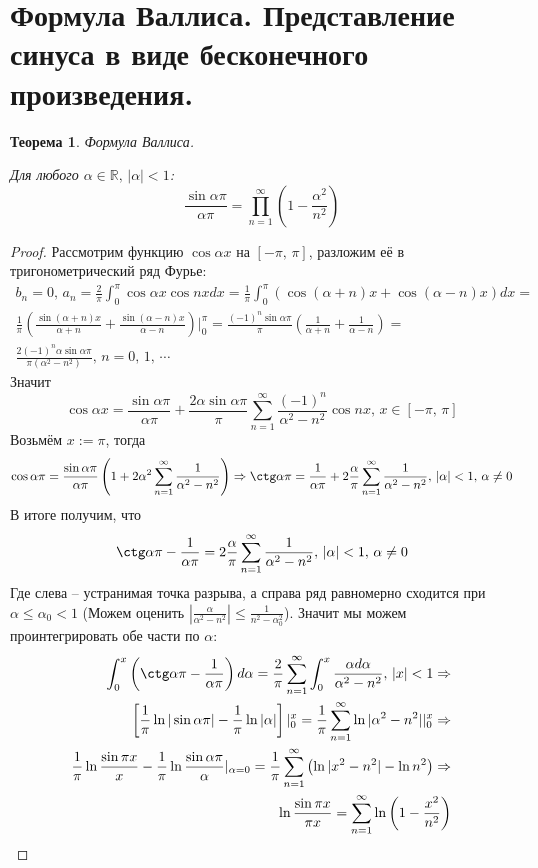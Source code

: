 \documentclass[a4paper,12pt]{article}
\renewcommand{\leq}{\ensuremath{\leqslant}}
\theoremstyle{plain}
\newtheorem{theorem}{Теорема}[section]
\theoremstyle{definition}
\theoremstyle{remark}
\begin{document}
\section{Формула Валлиса. Представление синуса в виде бесконечного произведения.}
\begin{theorem}
	Формула Валлиса.

	Для любого $\alpha \in \mathbb{R},\, |\alpha| < 1$:
	\[\frac{\sin \alpha\pi}{\alpha\pi} = \prod_{n = 1}^\infty \left(1 - \frac{\alpha^2}{n^2}\right)\]
\end{theorem}
\begin{proof}
	Рассмотрим функцию $\cos\alpha x$ на $[-\pi,\,\pi]$, разложим её в тригонометрический ряд Фурье:
	\begin{align*}
		b_n = 0,\, a_n = \frac{2}{\pi}\int_0^\pi\cos\alpha x\cos nxdx = \frac{1}{\pi}\int_0^\pi(\cos(\alpha + n)x + \cos(\alpha - n)x)dx =                                                                        \\
		\frac{1}{\pi}\left(\frac{\sin(\alpha + n)x}{\alpha + n} + \frac{\sin(\alpha - n)x}{\alpha - n}\right)|_0^\pi = \frac{(-1)^n\sin\alpha\pi}{\pi}\left(\frac{1}{\alpha + n} + \frac{1}{\alpha - n }\right) = \\
		\frac{2(-1)^n\alpha\sin\alpha\pi}{\pi(\alpha^2 - n^2)},\, n = 0,\,1,\,\cdots
	\end{align*}
	Значит
	\[\cos\alpha x = \frac{\sin\alpha\pi}{\alpha\pi} + \frac{2\alpha\sin\alpha\pi}{\pi}\sum_{n = 1}^\infty \frac{(-1)^n}{\alpha^2 - n^2}\cos nx,\, x \in [-\pi,\,\pi]\]
	Возьмём $x := \pi$, тогда
	\[\cos\alpha\pi = \frac{\sin\alpha\pi}{\alpha\pi}\left(1 + 2\alpha^2\sum_{n = 1}^\infty \frac{1}{\alpha^2 - n^2}\right) \Rightarrow \ctg\alpha\pi = \frac{1}{\alpha\pi} + 2\frac{\alpha}{\pi}\sum_{n=1}^\infty\frac{1}{\alpha^2 - n^2},\, |\alpha| < 1,\, \alpha \neq 0\]
	В итоге получим, что
	\[\ctg\alpha\pi  - \frac{1}{\alpha\pi} = 2\frac{\alpha}{\pi}\sum_{n=1}^\infty\frac{1}{\alpha^2 - n^2},\, |\alpha| < 1,\, \alpha \neq 0\]
	Где слева -- устранимая точка разрыва, а справа ряд равномерно сходится при $\alpha \leq \alpha_0 < 1$ (Можем оценить $\left|\frac{\alpha}{\alpha^2 - n^2}\right|\leq \frac{1}{n^2 - \alpha_0^2}$). Значит мы можем проинтегрировать обе части по $\alpha$:
	\begin{align*}
		\int_0^x \left(\ctg\alpha\pi  - \frac{1}{\alpha\pi}\right)d\alpha = \frac{2}{\pi}\sum_{n = 1}^\infty \int_0^x \frac{\alpha d\alpha}{\alpha^2 - n^2},\, |x| < 1 \Rightarrow           \\
		\left[\frac{1}{\pi}\ln|\sin\alpha\pi| - \frac{1}{\pi}\ln|\alpha|\right]|_0^x = \frac{1}{\pi}\sum_{n = 1}^\infty\ln|\alpha^2 - n^2||_0^x \Rightarrow                                  \\
		\frac{1}{\pi}\ln\frac{\sin\pi x}{x} - \frac{1}{\pi}\ln\frac{\sin\alpha\pi}{\alpha}|_{\alpha = 0} = \frac{1}{\pi}\sum_{n = 1}^\infty\left(\ln|x^2 - n^2| - \ln n^2\right) \Rightarrow \\
		\ln\frac{\sin\pi x}{\pi x} = \sum_{n = 1}^\infty \ln\left(1 - \frac{x^2}{n^2}\right)
	\end{align*}
\end{proof}
\end{document}
